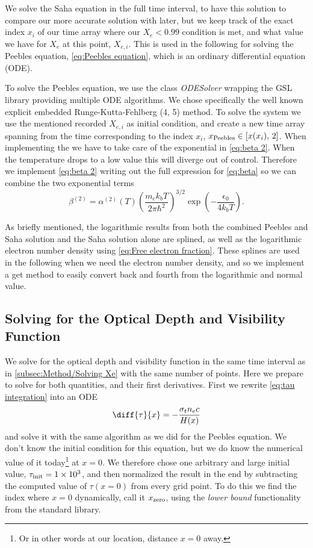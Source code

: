 \documentclass[10pt,a4paper]{article}
\begin{document}
We solve the Saha equation in the full time interval, to have this solution to compare our more accurate solution with later, but we keep track of the exact index $x_i$ of our time array where our $X_e< 0.99$ condition is met, and what value we have for $X_e$ at this point, $X_{e,i}$. This is used in the following for solving the Peebles equation, \cref{eq:Peebles equation}, which is an ordinary differential equation (ODE).

To solve the Peebles equation, we use the class \textit{ODESolver} wrapping the GSL library providing multiple ODE algorithms. We chose specifically the well known explicit embedded Runge-Kutta-Fehlberg (4, 5) method\citep{gsl-doc}. To solve the system we use the mentioned recorded $X_{e,i}$ as initial condition, and create a new time array spanning from the time corresponding to the index $x_i$, $x_{\rm{Peebles}} \in \left[x(x_i),\, 2\right]$. When implementing the  we have to take care of the exponential in \cref{eq:beta 2}. When the temperature drops to a low value this will diverge out of control. Therefore we implement \cref{eq:beta 2} writing out the full expression for \cref{eq:beta} so we can combine the two exponential terms
\begin{equation*}
    \beta^{(2)} = \alpha^{(2)}(T) \left(\frac{m_e k_b T}{2\pi\hbar^2}\right)^{3/2} \exp(-\frac{\epsilon_0}{4k_b T}).
\end{equation*}

As briefly mentioned, the logarithmic results from both the combined Peebles and Saha solution and the Saha solution alone are splined, as well as the logarithmic electron number density using \cref{eq:Free electron fraction}. These splines are used in the following when we need the electron number density, and so we implement a get method to easily convert back and fourth from the logarithmic and normal value.

\subsection{Solving for the Optical Depth and Visibility Function}
\label{subsec:method/tau and g}
We solve for the optical depth and visibility function in the same time interval as in \cref{subsec:Method/Solving Xe} with the same number of points. Here we prepare to solve for both quantities, and their first derivatives. First we rewrite \cref{eq:tau integration} into an ODE
\begin{equation}
    \diff{\tau }{x} = -\frac{\sigma_t n_e c}{H(x)}
    \label{eq: tau ODE}
\end{equation}
and solve it with the same algorithm as we did for the Peebles equation. We don't know the initial condition for this equation, but we do know the numerical value of it today\footnote{Or in other words at our location, distance $x=0$ away.} at $x=0$. We therefore chose one arbitrary and large initial value, $\tau_{\rm{init}} = \num{1e3}$, and then normalized the result in the end by subtracting the computed value of $\tau(x=0)$ from every grid point. To do this we find the index where $x=0$ dynamically, call it $x_{\rm{zero}}$, using the \textit{lower bound} functionality from the standard library.
\end{document}
